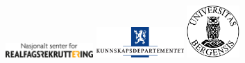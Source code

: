 \documentclass[a4paper, 12pt]{article}
\begin{document}
\vfill
\noindent
\begin{minipage}[c]{\textwidth}
	\includegraphics[width=0.25\textwidth]{figs/nsfr_logo.jpg}
	\hfill
	\includegraphics[width=0.25\textwidth]{figs/kd_logo.jpg}
	\hfill
	\includegraphics[width=0.15\textwidth]{figs/uib_logo.png}
\end{minipage}
\end{document}

